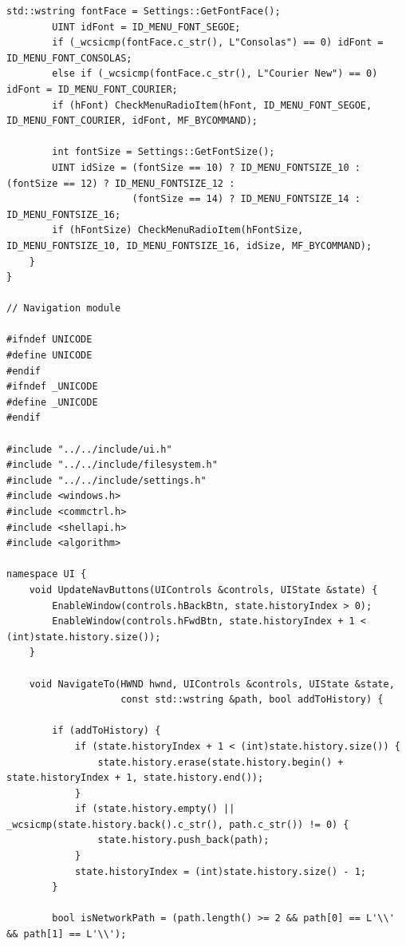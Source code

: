 \begin{lstlisting}[style=CodeListing]
        std::wstring fontFace = Settings::GetFontFace();
        UINT idFont = ID_MENU_FONT_SEGOE;
        if (_wcsicmp(fontFace.c_str(), L"Consolas") == 0) idFont = ID_MENU_FONT_CONSOLAS;
        else if (_wcsicmp(fontFace.c_str(), L"Courier New") == 0) idFont = ID_MENU_FONT_COURIER;
        if (hFont) CheckMenuRadioItem(hFont, ID_MENU_FONT_SEGOE, ID_MENU_FONT_COURIER, idFont, MF_BYCOMMAND);
        
        int fontSize = Settings::GetFontSize();
        UINT idSize = (fontSize == 10) ? ID_MENU_FONTSIZE_10 : (fontSize == 12) ? ID_MENU_FONTSIZE_12 : 
                      (fontSize == 14) ? ID_MENU_FONTSIZE_14 : ID_MENU_FONTSIZE_16;
        if (hFontSize) CheckMenuRadioItem(hFontSize, ID_MENU_FONTSIZE_10, ID_MENU_FONTSIZE_16, idSize, MF_BYCOMMAND);
    }
}

// Navigation module

#ifndef UNICODE
#define UNICODE
#endif
#ifndef _UNICODE
#define _UNICODE
#endif

#include "../../include/ui.h"
#include "../../include/filesystem.h"
#include "../../include/settings.h"
#include <windows.h>
#include <commctrl.h>
#include <shellapi.h>
#include <algorithm>

namespace UI {
    void UpdateNavButtons(UIControls &controls, UIState &state) {
        EnableWindow(controls.hBackBtn, state.historyIndex > 0);
        EnableWindow(controls.hFwdBtn, state.historyIndex + 1 < (int)state.history.size());
    }
    
    void NavigateTo(HWND hwnd, UIControls &controls, UIState &state, 
                    const std::wstring &path, bool addToHistory) {
        
        if (addToHistory) {
            if (state.historyIndex + 1 < (int)state.history.size()) {
                state.history.erase(state.history.begin() + state.historyIndex + 1, state.history.end());
            }
            if (state.history.empty() || _wcsicmp(state.history.back().c_str(), path.c_str()) != 0) {
                state.history.push_back(path);
            }
            state.historyIndex = (int)state.history.size() - 1;
        }
        
        bool isNetworkPath = (path.length() >= 2 && path[0] == L'\\' && path[1] == L'\\');
        

\end{lstlisting}
